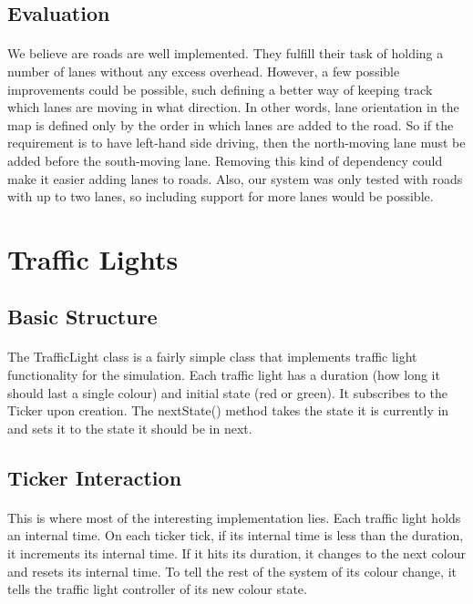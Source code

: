 \documentclass[a4paper,11pt,titlepage]{article}
\begin{document}
\subsection{Evaluation}
\paragraph{}
We believe are roads are well implemented. They fulfill their task of holding a number of lanes without any excess overhead. However, a few possible improvements could be possible, such defining a better way of keeping track which lanes are moving in what direction. In other words, lane orientation in the map is defined only by the order in which lanes are added to the road. So if the requirement is to have left-hand side driving, then the north-moving lane must be added before the south-moving lane. Removing this kind of dependency could make it easier adding lanes to roads. Also, our system was only tested with roads with up to two lanes, so including support for more lanes would be possible.

\section{Traffic Lights}\label{trafficlights}
\subsection{Basic Structure}
\paragraph{}
The TrafficLight class is a fairly simple class that implements traffic light functionality for the simulation. Each traffic light has a duration (how long it should last a single colour) and initial state (red or green). It subscribes to the Ticker upon creation. The nextState() method takes the state it is currently in and sets it to the state it should be in next.

\subsection{Ticker Interaction}
\paragraph{}
This is where most of the interesting implementation lies. Each traffic light holds an internal time. On each ticker tick, if its internal time is less than the duration, it increments its internal time. If it hits its duration, it changes to the next colour and resets its internal time. To tell the rest of the system of its colour change, it tells the traffic light controller of its new colour state.
\end{document}
